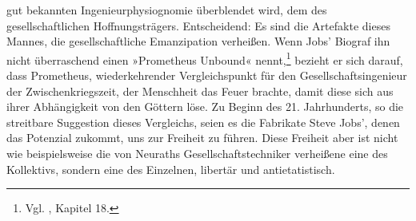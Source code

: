 \documentclass[%
	fontsize=10pt,%
	twoside,%
	headings=optiontoheadandtoc,%
	showtrims]{scrbook}
\renewcommand{\texttt}{\nohyphens} %
\begin{document}
gut bekannten Ingenieurphysiognomie überblendet wird, dem des \texttt{gesellschaftlichen} Hoffnungsträgers. Entscheidend: Es sind die Artefakte dieses Mannes, die gesellschaftliche Emanzipation verheißen. Wenn Jobs\textquoteright{} Biograf ihn nicht überraschend einen »Prometheus Unbound« nennt,\footnote{Vgl. \cite[][]{isaacson2011a}, Kapitel 18.}  bezieht er sich darauf, dass Prometheus, wiederkehrender Vergleichspunkt für den Gesellschaftsingenieur der Zwischenkriegszeit, der Menschheit das Feuer brachte, damit diese sich aus ihrer Abhängigkeit von den Göttern löse. Zu Beginn des 21. Jahrhunderts, so die streitbare Suggestion dieses Vergleichs, seien es die Fabrikate Steve Jobs\textquoteright{}, denen das Potenzial zukommt, uns zur Freiheit zu führen. Diese Freiheit aber ist nicht wie beispielsweise die von Neuraths Gesellschaftstechniker verheißene eine des Kollektivs, sondern eine des Einzelnen, libertär und antietatistisch.
\end{document}
